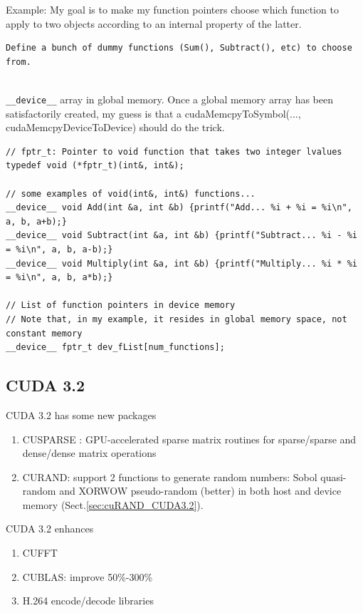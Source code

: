 Example: My goal is to make my function pointers choose which function to apply
to two objects according to an internal property of the latter.
\begin{verbatim}
Define a bunch of dummy functions (Sum(), Subtract(), etc) to choose from.


\end{verbatim}



\verb!__device__! array in global memory. 
Once a global memory array has been
satisfactorily created, my guess is that a cudaMemcpyToSymbol(...,
cudaMemcpyDeviceToDevice) should do the trick.





\begin{verbatim}
// fptr_t: Pointer to void function that takes two integer lvalues
typedef void (*fptr_t)(int&, int&);

// some examples of void(int&, int&) functions...
__device__ void Add(int &a, int &b) {printf("Add... %i + %i = %i\n", a, b, a+b);}
__device__ void Subtract(int &a, int &b) {printf("Subtract... %i - %i = %i\n", a, b, a-b);}
__device__ void Multiply(int &a, int &b) {printf("Multiply... %i * %i = %i\n", a, b, a*b);}

// List of function pointers in device memory
// Note that, in my example, it resides in global memory space, not constant memory
__device__ fptr_t dev_fList[num_functions];

\end{verbatim}



\subsection{CUDA 3.2}
\label{sec:CUDA_3.2}

CUDA 3.2 has some new packages
\begin{enumerate}
\item CUSPARSE : GPU-accelerated sparse matrix routines for
  sparse/sparse and dense/dense matrix operations
\item CURAND: support 2 functions to generate random numbers: Sobol
  quasi-random and XORWOW pseudo-random (better) in both host and
  device memory (Sect.\ref{sec:cuRAND_CUDA3.2}).
\end{enumerate}

CUDA 3.2 enhances
\begin{enumerate}
\item CUFFT
\item CUBLAS: improve 50\%-300\%
\item H.264 encode/decode libraries
\end{enumerate}

